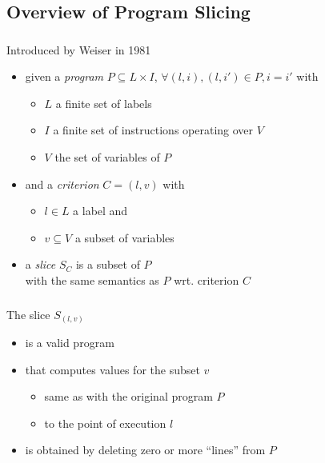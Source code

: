 \documentclass{beamer}
\begin{document}
  \subsection{Overview of Program Slicing}
  \begin{frame}
    \frametitle{\secname}
    \framesubtitle{\subsecname}

    Introduced by Weiser in 1981~\cite{Wei81}
    \begin{itemize}
      \item given a \emph{program} $P \subseteq L \times I$, $\forall (l,i), (l,i') \in P, i = i'$ with
        \begin{itemize}
          \item $L$ a finite set of labels
          \item $I$ a finite set of instructions operating over $V$
          \item $V$ the set of variables of $P$
        \end{itemize}

      \vspace{1em}
      \item and a \emph{criterion} $C = (l,v)$ with
        \begin{itemize}
          \item $l \in L$ a label and
          \item $v \subseteq V$ a subset of variables
        \end{itemize}
        
      \vspace{1em}
      \item a \emph{slice} $S_C$ is a subset of $P$ \\
      with the same semantics as $P$ wrt. criterion $C$
    \end{itemize}
  \end{frame}

  \begin{frame}
    \frametitle{\secname}
    \framesubtitle{\subsecname}

    The slice $S_{(l,v)}$
    \begin{itemize}
      \item is a valid program
      \item that computes values for the subset $v$
        \begin{itemize}
          \item same as with the original program $P$
          \item to the point of execution $l$ 
        \end{itemize}
      \item is obtained by deleting zero or more ``lines'' from $P$
    \end{itemize}

  \end{frame}
  
\end{document}
